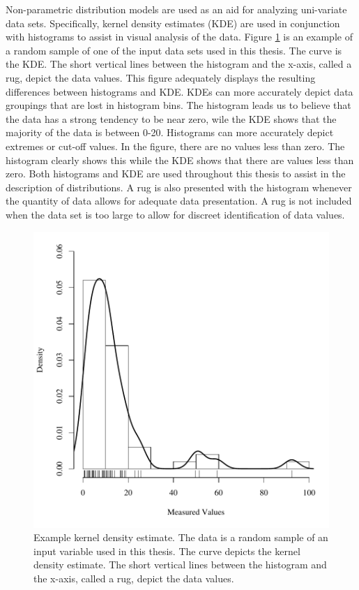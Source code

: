 Non-parametric distribution models are used as an aid for analyzing uni-variate data sets.  Specifically, kernel density estimates (KDE) are used in conjunction with histograms to assist in visual analysis of the data.  Figure \ref{fig:ExampleDistAnalysis} is an example of a random sample of one of the input data sets used in this thesis.  The curve is the KDE.  The short vertical lines between the histogram and the x-axis, called a rug, depict the data values.  This figure adequately displays the resulting differences between histograms and KDE.  KDEs can more accurately depict data groupings that are lost in histogram bins.  The histogram leads us to believe that the data has a strong tendency to be near zero, wile the KDE shows that the majority of the data is between 0-20.  Histograms can more accurately depict extremes or cut-off values.  In the figure, there are no values less than zero.  The histogram clearly shows this while the KDE shows that there are values less than zero.  Both histograms and KDE are used throughout this thesis to assist in the description of distributions.  A rug is also presented with the histogram whenever the quantity of data allows for adequate data presentation.  A rug is not included when the data set is too large to allow for discreet identification of data values.

\begin{figure}[htbp]
\centering
	\includegraphics[width=6in]{"Figures/Example KDE"}
	\caption[Example kernel density estimate.]{Example kernel density estimate.  The data is a random sample of an input variable used in this thesis.  The curve depicts the kernel density estimate.  The short vertical lines between the histogram and the x-axis, called a rug, depict the data values.}
	\label{fig:ExampleDistAnalysis}
\end{figure}

